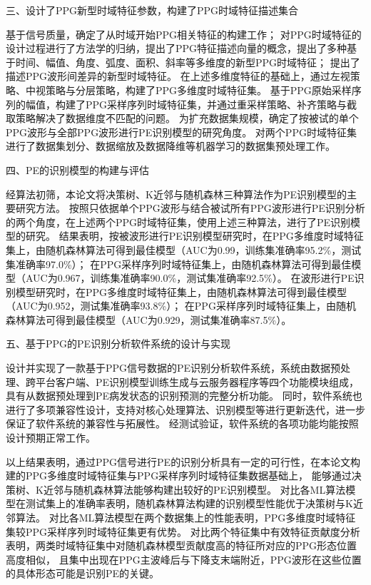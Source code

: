 三、设计了PPG新型时域特征参数，构建了PPG时域特征描述集合

基于信号质量，确定了从时域开始PPG相关特征的构建工作；
对PPG时域特征的设计过程进行了方法学的归纳，提出了PPG特征描述向量的概念，提出了多种基于时间、幅值、角度、弧度、面积、斜率等多维度的新型PPG时域特征；
提出了描述PPG波形间差异的新型时域特征。
在上述多维度特征的基础上，通过左视策略、中视策略与分层策略，构建了PPG多维度时域特征集。
基于PPG原始采样序列的幅值，构建了PPG采样序列时域特征集，并通过重采样策略、补齐策略与截取策略解决了数据维度不匹配的问题。
为扩充数据集规模，确定了按被试的单个PPG波形与全部PPG波形进行PE识别模型的研究角度。
对两个PPG时域特征集进行了数据集划分、数据缩放及数据降维等机器学习的数据集预处理工作。

四、PE的识别模型的构建与评估

经算法初筛，本论文将决策树、K近邻与随机森林三种算法作为PE识别模型的主要研究方法。
按照只依据单个PPG波形与结合被试所有PPG波形进行PE识别分析的两个角度，在上述两个PPG时域特征集，使用上述三种算法，进行了PE识别模型的研究。
结果表明，按被波形进行PE识别模型研究时，在PPG多维度时域特征集上，由随机森林算法可得到最佳模型（AUC为0.99，训练集准确率95.2\%，测试集准确率97.0\%）；
在PPG采样序列时域特征集上，由随机森林算法可得到最佳模型（AUC为0.967，训练集准确率90.0\%，测试集准确率92.5\%）。
在波形进行PE识别模型研究时，在PPG多维度时域特征集上，由随机森林算法可得到最佳模型（AUC为0.952，测试集准确率93.8\%）；
在PPG采样序列时域特征集上，由随机森林算法可得到最佳模型（AUC为0.929，测试集准确率87.5\%）。

五、基于PPG的PE识别分析软件系统的设计与实现

设计并实现了一款基于PPG信号数据的PE识别分析软件系统，系统由数据预处理、跨平台客户端、PE识别模型训练生成与云服务器程序等四个功能模块组成，
具有从数据预处理到PE病发状态的识别预测的完整分析功能。
同时，软件系统也进行了多项兼容性设计，支持对核心处理算法、识别模型等进行更新迭代，进一步保证了软件系统的兼容性与拓展性。
经测试验证，软件系统的各项功能均能按照设计预期正常工作。

以上结果表明，通过PPG信号进行PE的识别分析具有一定的可行性，在本论文构建的PPG多维度时域特征集与PPG采样序列时域特征集数据基础上，
能够通过决策树、K近邻与随机森林算法能够构建出较好的PE识别模型。
对比各ML算法模型在测试集上的准确率表明，随机森林算法构建的识别模型性能优于决策树与K近邻算法。
对比各ML算法模型在两个数据集上的性能表明，PPG多维度时域特征集较PPG采样序列时域特征集更有优势。
对比两个特征集中有效特征贡献度分析表明，两类时域特征集中对随机森林模型贡献度高的特征所对应的PPG形态位置高度相似，
且集中出现在PPG主波峰后与下降支末端附近，PPG波形在这些位置的具体形态可能是识别PE的关键。

